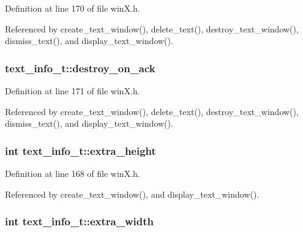 Definition at line 170 of file win\+X.\+h.



Referenced by create\+\_\+text\+\_\+window(), delete\+\_\+text(), destroy\+\_\+text\+\_\+window(), dismiss\+\_\+text(), and display\+\_\+text\+\_\+window().

\hypertarget{structtext__info__t_a69f8614343afa947cebede852bbb74a6}{
\subsubsection[{destroy\+\_\+on\+\_\+ack}]{ text\+\_\+info\+\_\+t\+::destroy\+\_\+on\+\_\+ack}}\label{structtext__info__t_a69f8614343afa947cebede852bbb74a6}


Definition at line 171 of file win\+X.\+h.



Referenced by create\+\_\+text\+\_\+window(), delete\+\_\+text(), destroy\+\_\+text\+\_\+window(), dismiss\+\_\+text(), and display\+\_\+text\+\_\+window().

\hypertarget{structtext__info__t_ad80f9412dbbf0aed0f1093b6097d4c63}{
\subsubsection[{extra\+\_\+height}]{\setlength{\rightskip}{0pt plus 5cm}int text\+\_\+info\+\_\+t\+::extra\+\_\+height}}\label{structtext__info__t_ad80f9412dbbf0aed0f1093b6097d4c63}


Definition at line 168 of file win\+X.\+h.



Referenced by create\+\_\+text\+\_\+window(), and display\+\_\+text\+\_\+window().

\hypertarget{structtext__info__t_a849d2019f93623095ae8f4134a2ffd77}{
\subsubsection[{extra\+\_\+width}]{\setlength{\rightskip}{0pt plus 5cm}int text\+\_\+info\+\_\+t\+::extra\+\_\+width}}\label{structtext__info__t_a849d2019f93623095ae8f4134a2ffd77}


